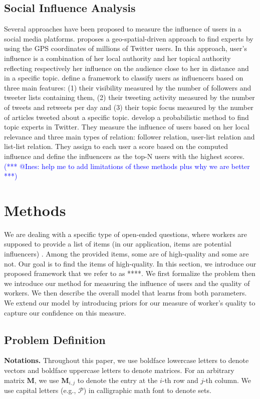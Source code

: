 \documentclass{article}
\makeatletter
\newcommand{\sys}{****\xspace}
\newcommand{\iar}[1]{\textcolor{blue}{(*** @Ines: #1 ***)}}
\makeatother
\begin{document}
\subsection{Social Influence Analysis}
Several approaches have been proposed 
to measure the influence of users in a social media platforms.
\cite{Cheng2014} proposes a geo-spatial-driven approach to find experts 
by using the GPS coordinates of millions of Twitter users. In this approach, user's influence
is a combination of her local authority and her topical authority reflecting respectively
her influence on the audience close to her in distance and in a specific topic.
\cite{Lehmann2013} define a framework to classify users as influencers 
based on three main features: (1) their visibility measured by the number of followers and tweeter
lists containing them, (2) their tweeting activity measured by the number of tweets and retweets 
per day and (3) their topic focus measured by the number of articles tweeted 
about a specific topic. 
\cite{wei2016learning} develop a probabilistic method to find topic experts in Twitter. They
measure the influence of users based on her local relevance and three main types of relation: 
follower relation, user-list relation and list-list relation. 
They assign to each user a score based on the computed influence and
define the influencers as the top-N users with the highest scores.
\iar{help me to add limitations of these methods plus why we are better}  
\section{Methods}
We are dealing with a specific type of open-ended questions, where workers are supposed to provide a list of items
(in our application, items are potential influencers) . 
Among the provided items, some are of high-quality and some are not. Our goal is to find the items of high-quality. 
In this section, we introduce our proposed framework that we refer to as
\sys. We first formalize the problem then we introduce our method for
 measuring the influence of users and the quality of workers. 
 We then describe the overall model that learns from both parameters.
 We extend our model by introducing priors for our measure of worker's quality to
 capture our confidence  on this measure.
\subsection{Problem Definition}
\smallskip
\noindent\textbf{Notations.} Throughout this paper, we use boldface lowercase letters to denote vectors and boldface uppercase letters to denote matrices. For an arbitrary matrix $\mathbf{M}$, we use $\mathbf{M}_{i,j}$ to denote the entry at the $i$-th row and $j$-th column. We use capital letters (e.g., $\mathcal{P}$) in calligraphic math font to denote sets.
\end{document}
